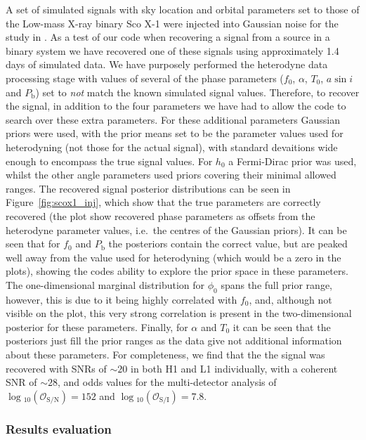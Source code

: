 A set of simulated signals with sky location and orbital parameters set to those of the Low-mass X-ray binary Sco X-1 were injected into
Gaussian noise for the study in \citet{2015PhRvD..92b3006M}. As a test of our code when recovering a signal from a source in a binary system
we have recovered one of these signals using approximately 1.4 days of simulated data. We have purposely performed the heterodyne data processing stage
with values of several of the phase parameters ($f_0$, $\alpha$, $T_0$, $a\sin{i}$ and $P_{\text{b}}$) set to {\it not} match the known simulated signal
values. Therefore, to recover the signal, in addition to the four \gw parameters we have had to allow the code to search over these extra parameters.
For these additional parameters Gaussian priors were used, with the prior means set to be the parameter values used for heterodyning (not those for
the actual signal), with standard devaitions wide enough to encompass the true signal values. For $h_0$ a Fermi-Dirac prior was used, whilst the other
angle parameters used priors covering their minimal allowed ranges. The recovered signal posterior distributions can be seen
in Figure~\ref{fig:scox1_inj}, which show that the true parameters are correctly recovered (the plot show recovered phase parameters as offsets from
the heterodyne parameter values, i.e.\ the centres of the Gaussian priors). It can be seen that for $f_0$ and $P_{\text{b}}$ the posteriors contain the
correct value, but are peaked well away from the value used for heterodyning (which would be a zero in the plots), showing the codes ability to explore
the prior space in these parameters. The one-dimensional marginal distribution for $\phi_0$ spans the full prior range, however, this is due to it being
highly correlated with $f_0$, and, although not visible on the plot, this very strong correlation is present in the two-dimensional posterior for these
parameters. Finally, for $\alpha$ and $T_0$ it can be seen that the posteriors just fill the prior ranges as the data give not additional information
about these parameters. For completeness, we find that the the signal was recovered with SNRs of $\sim 20$ in both H1 and L1 individually, with a coherent
SNR of $\sim 28$, and odds values for the multi-detector analysis of $\log{}_{10}\left(\mathcal{O}_{\text{S}/\text{N}}\right) = 152$
and $\log{}_{10}\left(\mathcal{O}_{\text{S}/\text{I}}\right) = 7.8$.

\subsubsection{Results evaluation}\label{sec:reseval}

